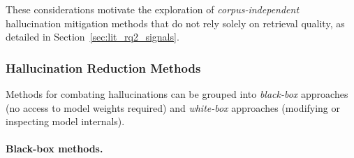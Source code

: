 These considerations motivate the exploration of \textit{corpus-independent} hallucination mitigation methods that do not rely solely on retrieval quality, as detailed in Section~\ref{sec:lit_rq2_signals}.

\subsubsection{Hallucination Reduction Methods}

Methods for combating hallucinations can be grouped into \emph{black-box} approaches (no access to model weights required) and \emph{white-box} approaches (modifying or inspecting model internals).

\paragraph{Black-box methods.}~

